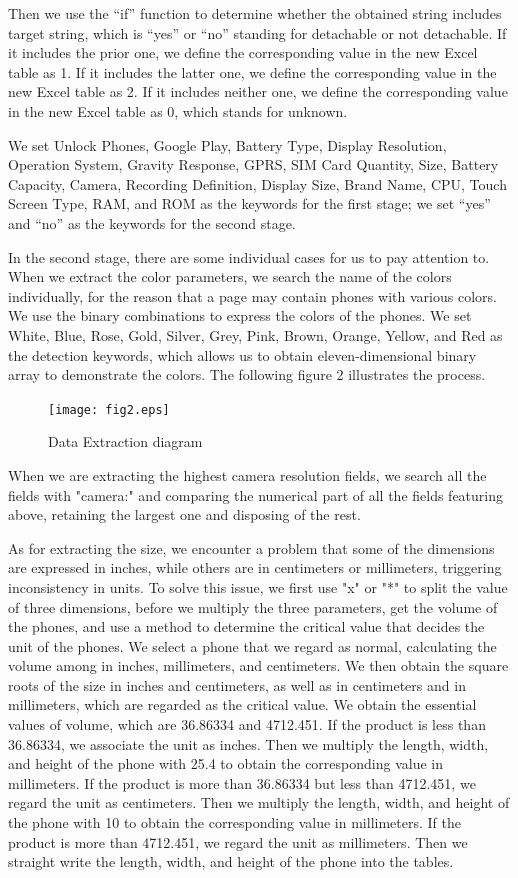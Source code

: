Then we use the “if” function to determine whether the obtained string includes target string, which is “yes” or “no” standing for detachable or not detachable. If it includes the prior one, we define the corresponding value in the new Excel table as 1. If it includes the latter one, we define the corresponding value in the new Excel table as 2. If it includes neither one, we define the corresponding value in the new Excel table as 0, which stands for unknown.

We set Unlock Phones, Google Play, Battery Type, Display Resolution, Operation System, Gravity Response, GPRS, SIM Card Quantity, Size, Battery Capacity, Camera, Recording Definition, Display Size, Brand Name, CPU, Touch Screen Type, RAM, and ROM as the keywords for the first stage; we set “yes” and “no” as the keywords for the second stage.

In the second stage, there are some individual cases for us to pay attention to. When we extract the color parameters, we search the name of the colors individually, for the reason that a page may contain phones with various colors. We use the binary combinations to express the colors of the phones. We set White, Blue, Rose, Gold, Silver, Grey, Pink, Brown, Orange, Yellow, and Red as the detection keywords, which allows us to obtain eleven-dimensional binary array to demonstrate the colors. The following figure 2 illustrates the process. 
\begin{figure}[!ht]
	\centering
	\texttt{[image: fig2.eps]}
	\caption{ Data Extraction diagram}
	\label{fig2}
\end{figure}

When we are extracting the highest camera resolution fields, we search all the fields with "camera:" and comparing the numerical part of all the fields featuring above, retaining the largest one and disposing of the rest. 

As for extracting the size, we encounter a problem that some of the dimensions are expressed in inches, while others are in centimeters or millimeters, triggering inconsistency in units. To solve this issue, we first use "x" or "*" to split the value of three dimensions, before we multiply the three parameters, get the volume of the phones, and use a method to determine the critical value that decides the unit of the phones. We select a phone that we regard as normal, calculating the volume among in inches, millimeters, and centimeters. We then obtain the square roots of the size in inches and centimeters, as well as in centimeters and in millimeters, which are regarded as the critical value. We obtain the essential values of volume, which are 36.86334 and 4712.451. If the product is less than 36.86334, we associate the unit as inches. Then we multiply the length, width, and height of the phone with 25.4 to obtain the corresponding value in millimeters. If the product is more than 36.86334 but less than 4712.451, we regard the unit as centimeters. Then we multiply the length, width, and height of the phone with 10 to obtain the corresponding value in millimeters. If the product is more than 4712.451, we regard the unit as millimeters. Then we straight write the length, width, and height of the phone into the tables. 

